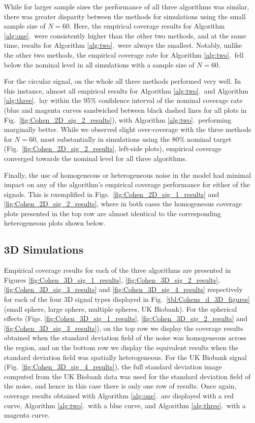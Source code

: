 While for larger sample sizes the performance of all three algorithms was similar, there was greater disparity between the methods for simulations using the small sample size of $N = 60$. Here, the empirical coverage results for Algorithm \ref{alg:one}.\ were consistently higher than the other two methods, and at the same time, results for Algorithm \ref{alg:two}.\ were always the smallest. Notably, unlike the other two methods, the empirical coverage rate for Algorithm \ref{alg:two}.\ fell below the nominal level in all simulations with a sample size of $N = 60$. 

For the circular signal, on the whole all three methods performed very well. In this instance, almost all empirical results for Algorithm \ref{alg:two}.\ and Algorithm \ref{alg:three}.\ lay within the 95\% confidence interval of the nominal coverage rate (blue and magenta curves sandwiched between black dashed lines for all plots in Fig.\ \ref{fig:Cohen_2D_sig_2_results}), with Algorithm \ref{alg:two}.\ performing marginally better. While we observed slight over-coverage with the three methods for $N = 60$, most substantially in simulations using the 80\% nominal target (Fig.\ \ref{fig:Cohen_2D_sig_2_results}, left-side plots), empirical coverage converged towards the nominal level for all three algorithms.

Finally, the use of homogeneous or heterogeneous noise in the model had minimal impact on any of the algorithm's empirical coverage performance for either of the signals. This is exemplified in Figs.\ \ref{fig:Cohen_2D_sig_1_results} and \ref{fig:Cohen_2D_sig_2_results}, where in both cases the homogeneous coverage plots presented in the top row are almost identical to the corresponding heterogeneous plots shown below. 

\subsection{3D Simulations} 
\label{sec:3d_sim_results}
Empirical coverage results for each of the three algorithms are presented in Figures \ref{fig:Cohen_3D_sig_1_results}, \ref{fig:Cohen_3D_sig_2_results}, \ref{fig:Cohen_3D_sig_3_results} and \ref{fig:Cohen_3D_sig_4_results} respectively for each of the four 3D signal types displayed in Fig.\ \ref{tbl:Cohens_d_3D_figures} (small sphere, large sphere, multiple spheres, UK Biobank). For the spherical effects (Figs. \ref{fig:Cohen_3D_sig_1_results}, \ref{fig:Cohen_3D_sig_2_results} and \ref{fig:Cohen_3D_sig_3_results}), on the top row we display the coverage results obtained when the standard deviation field of the noise was homogeneous across the region, and on the bottom row we display the equivalent results when the standard deviation field was spatially heterogeneous. For the UK Biobank signal (Fig.\ \ref{fig:Cohen_3D_sig_4_results}), the full standard deviation image computed from the UK Biobank data was used for the standard deviation field of the noise, and hence in this case there is only one row of results. Once again, coverage results obtained with Algorithm \ref{alg:one}.\ are displayed with a red curve, Algorithm \ref{alg:two}.\ with a blue curve, and Algorithm \ref{alg:three}.\ with a magenta curve.

